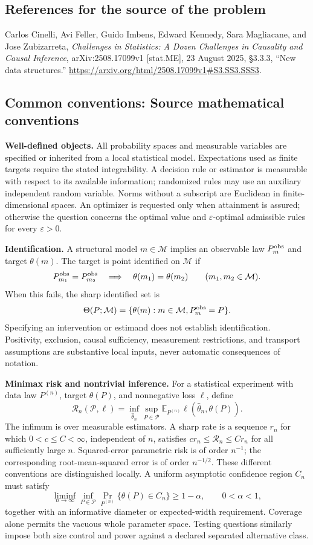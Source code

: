 \documentclass[11pt,a4paper]{article}
\newcommand{\E}{\mathbb E}
\begin{document}
\subsection*{References for the source of the problem}
Carlos Cinelli, Avi Feller, Guido Imbens, Edward Kennedy, Sara Magliacane, and Jose Zubizarreta, \emph{Challenges in Statistics: A Dozen Challenges in Causality and Causal Inference}, arXiv:2508.17099v1 [stat.ME], 23 August 2025, \S3.3.3, ``New data structures.'' \url{https://arxiv.org/html/2508.17099v1#S3.SS3.SSS3}.

\subsection*{Common conventions: Source mathematical conventions}

\textbf{Well-defined objects.}
All probability spaces and measurable variables are specified or inherited
from a local statistical model. Expectations used as finite targets require
the stated integrability. A decision rule or estimator is measurable with
respect to its available information; randomized rules may use an auxiliary
independent random variable. Norms without a subscript are Euclidean in
finite-dimensional spaces. An optimizer is requested only when attainment
is assured; otherwise the question concerns the optimal value and
$\varepsilon$-optimal admissible rules for every $\varepsilon>0$.

\textbf{Identification.}
A structural model $m\in\mathcal M$ implies an observable law
$P_m^{\rm obs}$ and target $\theta(m)$. The target is point identified on
$\mathcal M$ if
\[
 P_{m_1}^{\rm obs}=P_{m_2}^{\rm obs}
 \quad\Longrightarrow\quad\theta(m_1)=\theta(m_2)
 \qquad(m_1,m_2\in\mathcal M).
\]
When this fails, the sharp identified set is
\[
 \Theta(P;\mathcal M)=\{\theta(m):m\in\mathcal M,
                                  P_m^{\rm obs}=P\}.
\]
Specifying an intervention or estimand does not establish identification.
Positivity, exclusion, causal sufficiency, measurement restrictions, and
transport assumptions are substantive local inputs, never automatic
consequences of notation.

\textbf{Minimax risk and nontrivial inference.}
For a statistical experiment with data law $P^{(n)}$, target $\theta(P)$,
and nonnegative loss $\ell$, define
\[
 \mathcal R_n(\mathcal P,\ell)
   =\inf_{\widehat\theta_n}\sup_{P\in\mathcal P}
      \E_{P^{(n)}}\ell(\widehat\theta_n,\theta(P)).
\]
The infimum is over measurable estimators. A sharp rate is a sequence
$r_n$ for which $0<c\leq C<\infty$, independent of $n$, satisfies
$c r_n\leq\mathcal R_n\leq C r_n$ for all sufficiently large $n$.
Squared-error parametric risk is of order $n^{-1}$; the corresponding
root-mean-squared error is of order $n^{-1/2}$. These different conventions
are distinguished locally. A uniform asymptotic confidence region $C_n$
must satisfy
\[
 \liminf_{n\to\infty}\inf_{P\in\mathcal P}
     \Pr_{P^{(n)}}\{\theta(P)\in C_n\}\geq 1-\alpha,
 \qquad 0<\alpha<1,
\]
together with an informative diameter or expected-width requirement.
Coverage alone permits the vacuous whole parameter space. Testing questions
similarly impose both size control and power against a declared separated
alternative class.
\end{document}
